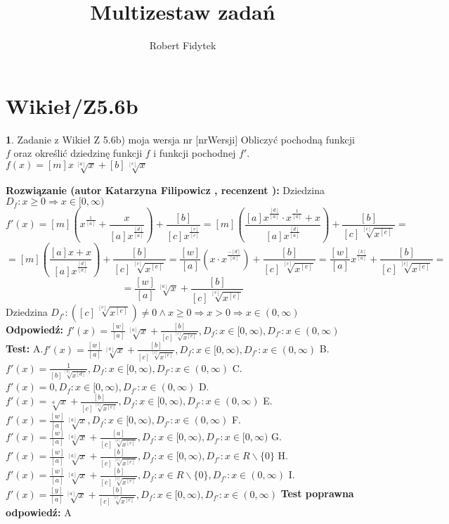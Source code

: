 \documentclass[12pt, a4paper]{article}
\title{Multizestaw zadań}
\author{Robert Fidytek}
\date{}
\theoremstyle{definition} %
\newtheorem{zad}{}
\newcommand{\kategoria}[1]{\section{#1}} %
\newcommand{\zadStart}[1]{\begin{zad}#1\newline} %
\newcommand{\zadStop}{\end{zad}}   %
\newcommand{\rozwStart}[2]{\noindent \textbf{Rozwiązanie (autor #1 , recenzent #2): }\newline} %
\newcommand{\rozwStop}{\newline}                                            %
\newcommand{\odpStart}{\noindent \textbf{Odpowiedź:}\newline}    %
\newcommand{\odpStop}{\newline}                                             %
\newcommand{\testStart}{\noindent \textbf{Test:}\newline} %
\newcommand{\testStop}{\newline} %
\newcommand{\kluczStart}{\noindent \textbf{Test poprawna odpowiedź:}\newline} %
\newcommand{\kluczStop}{\newline} %
\begin{document}
\maketitle


\kategoria{Wikieł/Z5.6b}
\zadStart{Zadanie z Wikieł Z 5.6b) moja wersja nr [nrWersji]}
Obliczyć pochodną funkcji $f$ oraz określić dziedzinę funkcji $f$ i funkcji pochodnej $f'$.\\
$f(x)=[m]x\sqrt[[a]]{x}+[b]\sqrt[[c]]{x}$
\zadStop
\rozwStart{Katarzyna Filipowicz}{}
Dziedzina $D_f: x \geq 0 \Rightarrow x \in [0,\infty)$
$$
f'(x)=[m]\left(x^{\frac{1}{[a]}}+\frac{x}{[a]x^{\frac{[d]}{[a]}}}\right)+\frac{[b]}{[c]x^{\frac{[e]}{[c]}}}=[m]\left(\frac{[a]x^{\frac{[d]}{[a]}}\cdot x^{\frac{1}{[a]}}+x}{[a]x^{\frac{[d]}{[a]}}}\right)+\frac{[b]}{[c] \sqrt[[c]]{x^{[e]}}}=
$$ $$
=[m]\left(\frac{[a]x+x}{[a]x^{\frac{[d]}{[a]}}}\right)+\frac{[b]}{[c] \sqrt[[c]]{x^{[e]}}}
=\frac{[w]}{[a]}\left(x \cdot x^{\frac{-[d]}{[a]}}\right)+\frac{[b]}{[c] \sqrt[[c]]{x^{[e]}}}=
\frac{[w]}{[a]} x^{\frac{[k]}{[a]}}+\frac{[b]}{[c] \sqrt[[c]]{x^{[e]}}}=
$$  $$
=\frac{[w]}{[a]} \sqrt[[a]]{x}+\frac{[b]}{[c] \sqrt[[c]]{x^{[e]}}}
$$
Dziedzina $D_{f'}: ([c] \sqrt[[c]]{x^{[e]}}) \neq 0 \wedge x\geq 0 \Rightarrow x > 0 \Rightarrow   x \in (0,\infty)$
\rozwStop
\odpStart
$f'(x)=\frac{[w]}{[a]} \sqrt[[a]]{x}+\frac{[b]}{[c] \sqrt[[c]]{x^{[e]}}}, D_{f}:x \in [0,\infty), D_{f'}:x \in (0,\infty)$
\odpStop
\testStart
A.$f'(x)=\frac{[w]}{[a]} \sqrt[[a]]{x}+\frac{[b]}{[c] \sqrt[[c]]{x^{[e]}}}, D_{f}:x \in [0,\infty), D_{f'}:x \in (0,\infty)$
B.$f'(x)=\frac{1}{[b] \sqrt[[b]]{x^{[d]}}}, D_{f}:x \in [0,\infty), D_{f'}:x \in (0,\infty)$
C.$f'(x)=0, D_{f}:x \in [0,\infty), D_{f'}:x \in (0,\infty)$
D.$f'(x)= \sqrt[a]{x}+\frac{[b]}{[c] \sqrt[[c]]{x^{[e]}}}, D_{f}:x \in [0,\infty), D_{f'}:x \in (0,\infty)$
E.$f'(x)=\frac{[w]}{[a]} \sqrt[[a]]{x}, D_{f}:x \in [0,\infty), D_{f'}:x \in (0,\infty)$
F.$f'(x)=\frac{[w]}{[a]} \sqrt[[a]]{x}+\frac{[a]}{[c] \sqrt[[c]]{x^{[c]}}}, D_{f}:x \in [0,\infty), D_{f'}:x \in [0,\infty)$
G.$f'(x)=\frac{[w]}{[a]} \sqrt[[a]]{x}+\frac{[b]}{[c] \sqrt[[c]]{x^{[e]}}}, D_{f}:x \in [0,\infty), D_{f'}:x \in R\backslash \{0\}$
H.$f'(x)=\frac{[w]}{[a]} \sqrt[[a]]{x}+\frac{[b]}{[c] \sqrt[[c]]{x^{[e]}}}, D_{f}:x \in R\backslash \{0\}, D_{f'}:x \in (0,\infty)$
I.$f'(x)=\frac{[y]}{[a]} \sqrt[[a]]{x}+\frac{[b]}{[c] \sqrt[[c]]{x^{[e]}}}, D_{f}:x \in [0,\infty), D_{f'}:x \in (0,\infty)$
\testStop
\kluczStart
A
\kluczStop
\end{document}
